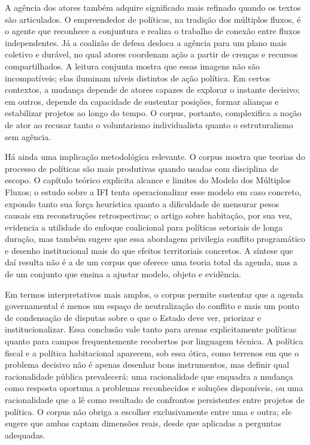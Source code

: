 \documentclass[12pt,a4paper]{article}
\begin{document}
A agência dos atores também adquire significado mais refinado quando os textos são articulados. O empreendedor de políticas, na tradição dos múltiplos fluxos, é o agente que reconhece a conjuntura e realiza o trabalho de conexão entre fluxos independentes. Já a coalizão de defesa desloca a agência para um plano mais coletivo e durável, no qual atores coordenam ação a partir de crenças e recursos compartilhados. A leitura conjunta mostra que essas imagens não são incompatíveis; elas iluminam níveis distintos de ação política. Em certos contextos, a mudança depende de atores capazes de explorar o instante decisivo; em outros, depende da capacidade de sustentar posições, formar alianças e estabilizar projetos ao longo do tempo. O corpus, portanto, complexifica a noção de ator ao recusar tanto o voluntarismo individualista quanto o estruturalismo sem agência.\parencite{brasil2022_abordagens_contemporaneas,ferreira2019_politica_habitacional}

Há ainda uma implicação metodológica relevante. O corpus mostra que teorias do processo de políticas são mais produtivas quando usadas com disciplina de escopo. O capítulo teórico explicita alcance e limites do Modelo dos Múltiplos Fluxos; o estudo sobre a IFI tenta operacionalizar esse modelo em caso concreto, expondo tanto sua força heurística quanto a dificuldade de mensurar pesos causais em reconstruções retrospectivas; o artigo sobre habitação, por sua vez, evidencia a utilidade do enfoque coalicional para políticas setoriais de longa duração, mas também sugere que essa abordagem privilegia conflito programático e desenho institucional mais do que efeitos territoriais concretos. A síntese que daí resulta não é a de um corpus que oferece uma teoria total da agenda, mas a de um conjunto que ensina a ajustar modelo, objeto e evidência.\parencite{brasil2022_abordagens_contemporaneas,anonsd_sem_titulo,ferreira2019_politica_habitacional}

Em termos interpretativos mais amplos, o corpus permite sustentar que a agenda governamental é menos um espaço de neutralização do conflito e mais um ponto de condensação de disputas sobre o que o Estado deve ver, priorizar e institucionalizar. Essa conclusão vale tanto para arenas explicitamente políticas quanto para campos frequentemente recobertos por linguagem técnica. A política fiscal e a política habitacional aparecem, sob essa ótica, como terrenos em que o problema decisivo não é apenas desenhar bons instrumentos, mas definir qual racionalidade pública prevalecerá: uma racionalidade que enquadra a mudança como resposta oportuna a problemas reconhecidos e soluções disponíveis, ou uma racionalidade que a lê como resultado de confrontos persistentes entre projetos de política. O corpus não obriga a escolher exclusivamente entre uma e outra; ele sugere que ambas captam dimensões reais, desde que aplicadas a perguntas adequadas.\parencite{anonsd_sem_titulo,ferreira2019_politica_habitacional,brasil2022_abordagens_contemporaneas}
\end{document}
